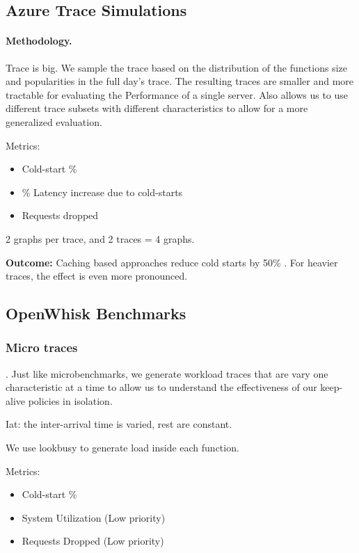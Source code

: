
\subsection{Azure Trace Simulations}

\paragraph{Methodology.} Trace is big. We sample the trace based on the distribution of the functions size and popularities in the full day's trace. The resulting traces are smaller and more tractable for evaluating the Performance of a single server. Also allows us to use different trace subsets with different characteristics to allow for a more generalized evaluation. 

Metrics: 
\begin{itemize}
\item Cold-start \% 
\item \% Latency increase due to cold-starts
\item Requests dropped 
\end{itemize}

2 graphs per trace, and 2 traces = 4 graphs. 

\textbf{Outcome:} Caching based approaches reduce cold starts by 50\% . For heavier traces, the effect is even more pronounced. 


\subsection{OpenWhisk Benchmarks}

\subsubsection{Micro traces}. Just like microbenchmarks, we generate workload traces that are vary one characteristic at a time to allow us to understand the effectiveness of our keep-alive policies in isolation.

Iat: the inter-arrival time is varied, rest  are constant.

We use lookbusy to generate load inside each function.

Metrics:
\begin{itemize}
\item Cold-start \%
\item System Utilization (Low priority) 
\item Requests Dropped (Low priority)
\end{itemize}

